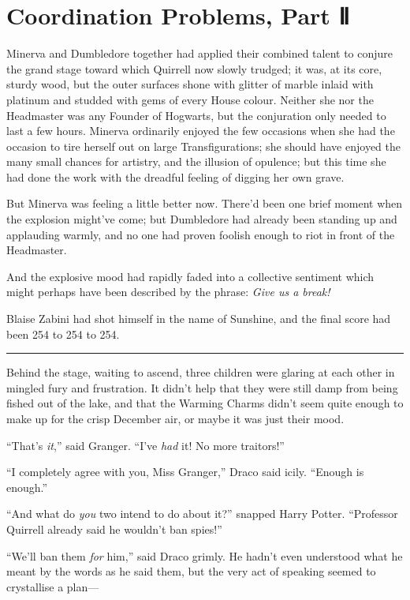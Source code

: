 \chapter{Coordination Problems, Part
Ⅱ}\label{coordination-problems-part}

Minerva and Dumbledore together had applied their combined talent to
conjure the grand stage toward which Quirrell now slowly trudged; it
was, at its core, sturdy wood, but the outer surfaces shone with glitter
of marble inlaid with platinum and studded with gems of every House
colour. Neither she nor the Headmaster was any Founder of Hogwarts, but
the conjuration only needed to last a few hours. Minerva ordinarily
enjoyed the few occasions when she had the occasion to tire herself out
on large Transfigurations; she should have enjoyed the many small
chances for artistry, and the illusion of opulence; but this time she
had done the work with the dreadful feeling of digging her own grave.

But Minerva was feeling a little better now. There'd been one brief
moment when the explosion might've come; but Dumbledore had already been
standing up and applauding warmly, and no one had proven foolish enough
to riot in front of the Headmaster.

And the explosive mood had rapidly faded into a collective sentiment
which might perhaps have been described by the phrase: \emph{Give us a
break!}

Blaise Zabini had shot himself in the name of Sunshine, and the final
score had been 254 to 254 to 254.

\begin{center}\rule{3in}{0.4pt}\end{center}

Behind the stage, waiting to ascend, three children were glaring at each
other in mingled fury and frustration. It didn't help that they were
still damp from being fished out of the lake, and that the Warming
Charms didn't seem quite enough to make up for the crisp December air,
or maybe it was just their mood.

``That's \emph{it},'' said Granger. ``I've \emph{had} it! No more
traitors!''

``I completely agree with you, Miss Granger,'' Draco said icily.
``Enough is enough.''

``And what do \emph{you} two intend to do about it?'' snapped Harry
Potter. ``Professor Quirrell already said he wouldn't ban spies!''

``We'll ban them \emph{for} him,'' said Draco grimly. He hadn't even
understood what he meant by the words as he said them, but the very act
of speaking seemed to crystallise a plan---

